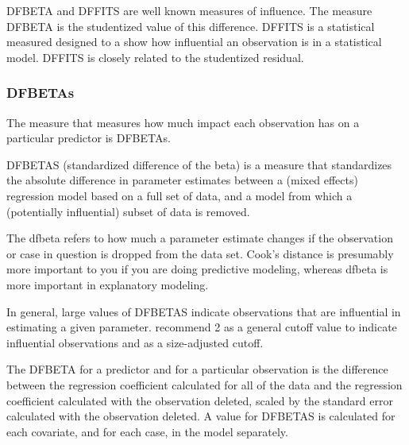 \documentclass[12pt, a4paper]{report}
\theoremstyle{plain}
\theoremstyle{definition}
\theoremstyle{remark}
\begin{document}
	DFBETA and DFFITS are well known measures of influence. The measure DFBETA is the studentized value of this difference. DFFITS is a statistical measured designed to a show how influential an observation is in a statistical model. DFFITS is closely related to the studentized residual.
	
	
	
	
	
	

	
	

	
	\subsubsection{DFBETAs}
	The measure that measures how much impact each observation has on a particular predictor is DFBETAs. 
	
	
	DFBETAS (standardized difference of the beta) is a measure that standardizes the absolute difference in parameter estimates between a (mixed effects) regression model based on a full set of data, and a model from which a (potentially influential) subset of data is removed. 
		
	
	The dfbeta refers to how much a parameter estimate changes if the observation or case in question is dropped from the data set.
	Cook's distance is presumably more important to you if you are doing predictive modeling, whereas dfbeta is more important in explanatory modeling.
	
	In general, large values of DFBETAS indicate observations that are influential in estimating a given parameter. \citet{belsley2005} recommend 2 as a general cutoff value to indicate influential observations and  as a size-adjusted cutoff.

		
	The DFBETA for a predictor and for a particular observation is the difference between the regression coefficient calculated for all of the data and the regression coefficient calculated with the observation deleted, scaled by the standard error calculated with the observation deleted. 
	A value for DFBETAS is calculated for each covariate, and for each case, in the model separately.
	
\end{document}

